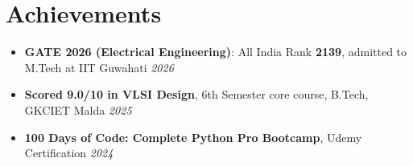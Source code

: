 \documentclass[a4paper,9pt]{extarticle}
\begin{document}
\section{Achievements}
\begin{itemize}[label=$\bullet$,leftmargin=1em,topsep=2pt,itemsep=1pt,parsep=0pt]
  \item \textbf{GATE 2026 (Electrical Engineering)}: All India Rank \textbf{2139}, admitted to M.Tech at IIT Guwahati \hfill \textit{2026}
  \item \textbf{Scored 9.0/10 in VLSI Design}, 6th Semester core course, B.Tech, GKCIET Malda \hfill \textit{2025}
  \item \textbf{100 Days of Code: Complete Python Pro Bootcamp}, Udemy Certification \hfill \textit{2024}
\end{itemize}
\end{document}

